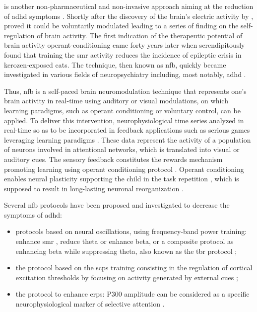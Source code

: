  is another non-pharmaceutical and non-invasive approach aiming at the reduction of \gls{adhd} symptoms 
\citep{Arns2015, Steffert2010, Marzbani2016}. Shortly after the discovery of the brain's electric activity by 
\citet{Berger1929}, \citet{Durup1935} proved it could be voluntarily modulated leading to a series of finding on the 
self-regulation of brain activity. The first indication of the therapeutic potential of brain activity operant-conditioning 
came forty years later when \citet{Sterman1974} serendipitously found that training the \gls{smr} activity reduces the incidence 
of epileptic crisis in kerozen-exposed cats. The technique, then known as \gls{nfb}, quickly became investigated in various 
fields of neuropsychiatry including, most notably, \gls{adhd} \citep{Lubar1976, Rossiter1995, Linden1996, Maurizio2014}.

Thus, \gls{nfb} is a self-paced brain neuromodulation technique that represents one's brain activity in real-time using auditory 
or visual modulations, on which learning paradigms, such as operant conditioning
\citep{Reynolds1975} or voluntary control, can be applied. To deliver this intervention, neurophysiological time series 
analyzed in real-time so as to be incorporated in feedback applications such as serious games leveraging learning paradigms \citep{Wang2010}. 
These data represent the activity of a population of neurons involved in attentional networks, which is translated into 
visual or auditory cues. The sensory feedback constitutes the rewards mechanism promoting learning using operant conditioning 
protocol \citep{Sherlin2011}. Operant conditioning enables neural plasticity supporting the child in the task repetition \citep{Skinner1961}, 
which is supposed to result in long-lasting neuronal reorganization \citep{VanDoren2017}. 

Several \gls{nfb} protocols have been proposed and investigated to decrease the symptoms of \gls{adhd}:
\begin{itemize} 
  \item protocols based on neural oscillations, using frequency-band power training: enhance \gls{smr} \citep{Beauregard2006}, reduce theta 
	  or enhance beta, or a composite protocol as enhancing beta while suppressing theta, also known as the \gls{tbr}
    protocol \citep{Lubar1976, Arns2013}; 
  \item the protocol based on the \glspl{scp} training consisting in the regulation of
    cortical excitation thresholds by focusing on activity generated by external cues 
    \citep{Heinrich2004, Banaschewski2007}; 
  \item the protocol to enhance \glspl{erp}: P300 amplitude can be considered as a specific
    neurophysiological marker of selective attention \citep{Fouillen2017}.  
\end{itemize} 

